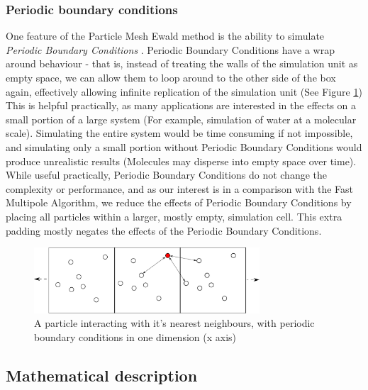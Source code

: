 \documentclass[pdftex,twoside,a4paper]{report}
\newcommand{\bcen}{\begin{center}}
\newcommand{\ecen}{\end{center}}
\newcommand{\pmem}{Particle Mesh Ewald method}
\newcommand{\fma}{Fast Multipole Algorithm}
\begin{document}
\subsubsection{Periodic boundary conditions}
\label{sec:pme_period_bound_cond}
One feature of the \pmem{} is the ability to simulate \emph{Periodic Boundary Conditions} \cite{essmann:8577}. Periodic Boundary Conditions have a wrap around behaviour - that is, instead of treating the walls of the simulation unit as empty space, we can allow them to loop around to the other side of the box again, effectively allowing infinite replication of the simulation unit (See Figure \ref{fig:pme_pbc}) This is helpful practically, as many applications are interested in the effects on a small portion of a large system \cite{toukmaji:73} (For example, simulation of water at a molecular scale). Simulating the entire system would be time consuming if not impossible, and simulating only a small portion without Periodic Boundary Conditions would produce unrealistic results (Molecules may disperse into empty space over time). While useful practically, Periodic Boundary Conditions do not change the complexity or performance, and as our interest is in a comparison with the \fma{}, we reduce the effects of Periodic Boundary Conditions by placing all particles within a larger, mostly empty, simulation cell. This extra padding mostly negates the effects of the Periodic Boundary Conditions.
\begin{figure}
\bcen \includegraphics[width=0.75\textwidth]{figures/pbc.pdf} \ecen
\caption{A particle interacting with it's nearest neighbours, with periodic boundary conditions in one dimension (x axis)}
\label{fig:pme_pbc}
\end{figure}

\subsection{Mathematical description}
\end{document}
